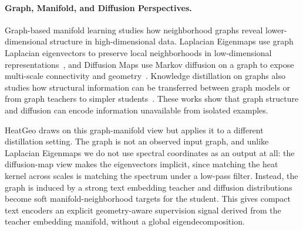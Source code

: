 \paragraph{Graph, Manifold, and Diffusion Perspectives.}
Graph-based manifold learning studies how neighborhood graphs reveal lower-dimensional structure in high-dimensional data. Laplacian Eigenmaps use graph Laplacian eigenvectors to preserve local neighborhoods in low-dimensional representations~\citep{belkin2003laplacian}, and Diffusion Maps use Markov diffusion on a graph to expose multi-scale connectivity and geometry~\citep{coifman2006diffusionmaps}. Knowledge distillation on graphs also studies how structural information can be transferred between graph models or from graph teachers to simpler students~\citep{yang2023graphkd_survey,zhang2022glnn}. These works show that graph structure and diffusion can encode information unavailable from isolated examples.

HeatGeo draws on this graph-manifold view but applies it to a different distillation setting. The graph is not an observed input graph, and unlike Laplacian Eigenmaps we do not use spectral coordinates as an output at all: the diffusion-map view makes the eigenvectors implicit, since matching the heat kernel across scales is matching the spectrum under a low-pass filter. Instead, the graph is induced by a strong text embedding teacher and diffusion distributions become soft manifold-neighborhood targets for the student. This gives compact text encoders an explicit geometry-aware supervision signal derived from the teacher embedding manifold, without a global eigendecomposition.
